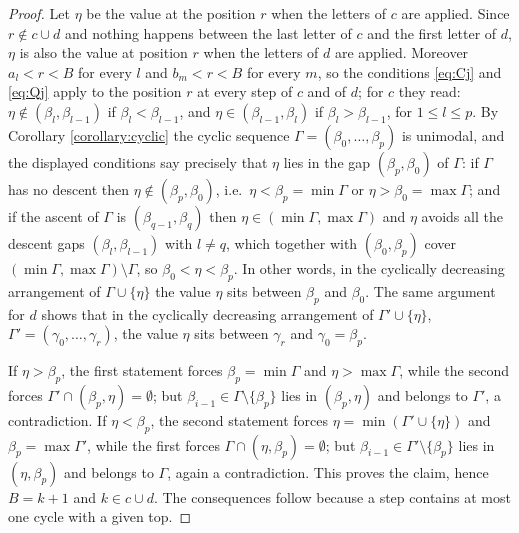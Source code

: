 \documentclass{amsart}
\theoremstyle{definition}
\theoremstyle{remark}
\numberwithin{equation}{section}
\begin{document}
\begin{proof}
Let $\eta$ be the value at the position $r$ when the letters of $c$ are applied. Since $r\notin c\cup d$ and nothing happens between the last letter of $c$ and the first letter of $d$, $\eta$ is also the value at position $r$ when the letters of $d$ are applied. Moreover $a_l<r<B$ for every $l$ and $b_m<r<B$ for every $m$, so the conditions \eqref{eq:Cj} and \eqref{eq:Qj} apply to the position $r$ at every step of $c$ and of $d$; for $c$ they read: $\eta\notin(\beta_l,\beta_{l-1})$ if $\beta_l<\beta_{l-1}$, and $\eta\in(\beta_{l-1},\beta_l)$ if $\beta_l>\beta_{l-1}$, for $1\leq l\leq p$. By Corollary \ref{corollary:cyclic} the cyclic sequence $\Gamma=(\beta_0,\ldots,\beta_p)$ is unimodal, and the displayed conditions say precisely that $\eta$ lies in the gap $(\beta_p,\beta_0)$ of $\Gamma$: if $\Gamma$ has no descent then $\eta\notin(\beta_p,\beta_0)$, i.e.\ $\eta<\beta_p=\min\Gamma$ or $\eta>\beta_0=\max\Gamma$; and if the ascent of $\Gamma$ is $(\beta_{q-1},\beta_q)$ then $\eta\in(\min\Gamma,\max\Gamma)$ and $\eta$ avoids all the descent gaps $(\beta_l,\beta_{l-1})$ with $l\neq q$, which together with $(\beta_0,\beta_p)$ cover $(\min\Gamma,\max\Gamma)\setminus\Gamma$, so $\beta_0<\eta<\beta_p$. In other words, in the cyclically decreasing arrangement of $\Gamma\cup\{\eta\}$ the value $\eta$ sits between $\beta_p$ and $\beta_0$. The same argument for $d$ shows that in the cyclically decreasing arrangement of $\Gamma'\cup\{\eta\}$, $\Gamma'=(\gamma_0,\ldots,\gamma_r)$, the value $\eta$ sits between $\gamma_r$ and $\gamma_0=\beta_p$.

If $\eta>\beta_p$, the first statement forces $\beta_p=\min\Gamma$ and $\eta>\max\Gamma$, while the second forces $\Gamma'\cap(\beta_p,\eta)=\emptyset$; but $\beta_{i-1}\in\Gamma\setminus\{\beta_p\}$ lies in $(\beta_p,\eta)$ and belongs to $\Gamma'$, a contradiction. If $\eta<\beta_p$, the second statement forces $\eta=\min(\Gamma'\cup\{\eta\})$ and $\beta_p=\max\Gamma'$, while the first forces $\Gamma\cap(\eta,\beta_p)=\emptyset$; but $\beta_{i-1}\in\Gamma'\setminus\{\beta_p\}$ lies in $(\eta,\beta_p)$ and belongs to $\Gamma$, again a contradiction. This proves the claim, hence $B=k+1$ and $k\in c\cup d$. The consequences follow because a step contains at most one cycle with a given top.
\end{proof}
\end{document}
